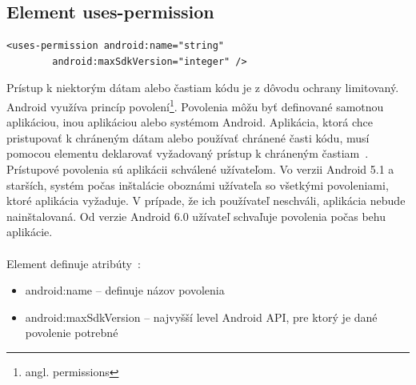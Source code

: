 \subsection{Element uses-permission}
\label{el_uses-permission}
\lstset{language=XML}
\begin{lstlisting}
<uses-permission android:name="string"
        android:maxSdkVersion="integer" />
\end{lstlisting}
Prístup k niektorým dátam alebo častiam kódu je z dôvodu ochrany limitovaný. Android využíva princíp povolení\footnote{angl. permissions}. Povolenia môžu byť definované samotnou aplikáciou, inou aplikáciou alebo systémom Android. Aplikácia, ktorá chce pristupovať k chráneným dátam alebo používať chránené časti kódu, musí pomocou elementu  deklarovať vyžadovaný prístup k chráneným častiam~\cite{appManifest}. Prístupové povolenia sú aplikácii schválené užívateľom. Vo verzii Android 5.1 a starších, systém počas inštalácie oboznámi užívateľa so všetkými povoleniami, ktoré aplikácia vyžaduje. V prípade, že ich používateľ neschváli, aplikácia nebude nainštalovaná. Od verzie Android 6.0 užívateľ schvaľuje povolenia počas behu aplikácie.\\\\ 
Element  definuje atribúty~\cite{elUsesPerm}:\\
\begin{itemize}
\item android:name – definuje názov povolenia
\item android:maxSdkVersion – najvyšší level Android API, pre ktorý je dané povolenie potrebné
\end{itemize}

